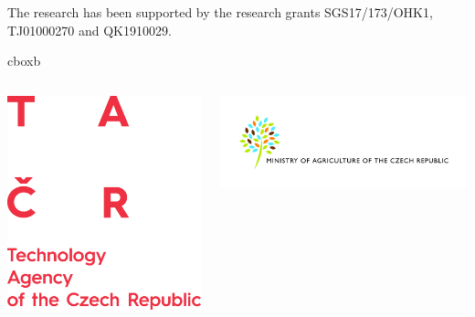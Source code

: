 \justifying
{\rmfamily
\vspace{0.4cm}
}

\justifying
{\rmfamily
The research has been supported by the research grants SGS17/173/OHK1, TJ01000270 and QK1910029.
}



\begin{beamercolorbox}[wd=\textwidth,dp=0.25cm]{cboxb}\end{beamercolorbox}\vspace{0.5cm}


\begin{columns}
    \begin{column}{0.1\textwidth}
    \centering
    \includegraphics[width =1\textwidth]{obr/logo_TACR_dopln_AJ.png}
    \end{column}
    \begin{column}{0.5\textwidth}
    \includegraphics[width = 1\textwidth]{obr/LogoMZeAJ.jpg}

\end{column}
\end{columns}
